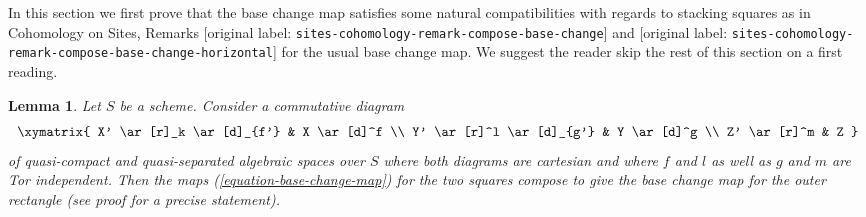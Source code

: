 \documentclass[10pt,a4paper]{article}
\theoremstyle{plain}
\newtheorem{lemma}[subsection]{Lemma}
\theoremstyle{definition}
\theoremstyle{remark}
\numberwithin{equation}{subsection}
\begin{document}
\medskip\noindent
In this section we first prove that the base change map satisfies
some natural compatibilities with regards to stacking squares as in
Cohomology on Sites, Remarks
\textnormal{[original label: \nolinkurl{sites-cohomology-remark-compose-base-change}]} and
\textnormal{[original label: \nolinkurl{sites-cohomology-remark-compose-base-change-horizontal}]}
for the usual base change map.
We suggest the reader skip the rest of this section on a first reading.

\begin{lemma}
\label{lemma-compose-base-change-maps}
Let $S$ be a scheme. Consider a commutative diagram
$$
\xymatrix{
X' \ar[r]_k \ar[d]_{f'} & X \ar[d]^f \\
Y' \ar[r]^l \ar[d]_{g'} & Y \ar[d]^g \\
Z' \ar[r]^m & Z
}
$$
of quasi-compact and quasi-separated algebraic spaces over $S$ where
both diagrams are cartesian and where $f$ and $l$
as well as $g$ and $m$ are Tor independent.
Then the maps (\ref{equation-base-change-map})
for the two squares compose to give the base
change map for the outer rectangle (see proof for a precise statement).
\end{lemma}
\end{document}
